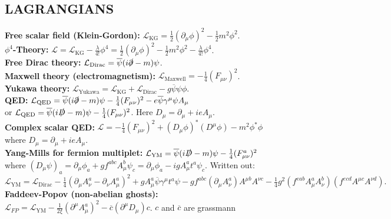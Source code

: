 \documentclass[a4paper, norsk, 8pt, landscape]{article}
\begin{document}
\begin{multicols*}{3}
\subsection*{\footnotesize  LAGRANGIANS}
 {\textbf{Free scalar field (Klein-Gordon):}}
$\mathcal{L}_{\text{KG}}=\frac{1}{2}(\partial_\mu \phi)^2-\frac{1}{2}m^2 \phi^2$.
\\
 {\textbf{$\phi^4$-Theory:}}
$\mathcal{L}=\mathcal{L}_{\text{KG}}-\frac{\lambda}{4!}\phi^4 =\frac{1}{2}(\partial_\mu \phi)^2-\frac{1}{2}m^2 \phi^2 -\frac{\lambda}{4!}\phi^4$.
\\
 {\textbf{Free Dirac theory:}}
$\mathcal{L}_{\text{Dirac}}=\overline{\psi}(i\slashed{\partial}-m)\psi$.
\\
 {\textbf{Maxwell theory (electromagnetism):}}
$\mathcal{L}_{\text{Maxwell}}=- \frac{1}{4}(F_{\mu\nu})^2$.
\\
 {\textbf{Yukawa theory:}}
$\mathcal{L}_{\text{Yukawa}}=\mathcal{L}_{\text{KG}}+\mathcal{L}_{\text{Dirac}}-g\overline{\psi}\psi \phi$.
\\
 {\textbf{QED:}}
$\mathcal{L}_{\text{QED}}=\overline{\psi}(i\slashed{\partial}-m)\psi
- \frac{1}{4}(F_{\mu\nu})^2-e\overline{\psi}\gamma^\mu \psi A_\mu$ \\
or
$\mathcal{L}_{\text{QED}}=\overline{\psi}(i\slashed{D}-m)\psi
- \frac{1}{4}(F_{\mu\nu})^2$. Here $D_\mu=\partial_\mu+ieA_\mu$.
\\
 {\textbf{Complex scalar QED:}}
$\mathcal{L}= -\frac{1}{4}(F_{\mu\nu})^2 +(D_\mu \phi)^* (D^\mu \phi) -m^2 \phi^* \phi$ \\
where $D_\mu = \partial_\mu + ie A_\mu$.
\\
 {\textbf{Yang-Mills for fermion multiplet:}}
$\mathcal{L}_{\text{YM}}= \overline{\psi}(i\slashed{D}-m)\psi-\frac{1}{4}(F_{\mu\nu}^a)^2$ \\
where $(D_\mu \psi)_a = \partial_\mu \phi_a + gf^{abc}A_\mu^b \psi_c
= \partial_\mu \phi_a - igA_\mu^a t^a \psi_c$. Written out: \\
$\mathcal{L}_{\text{YM}}=
\mathcal{L}_{\text{Dirac}}
-\frac{1}{4}(\partial_\mu A_\nu^a - \partial_\nu A_\mu^a)^2
+gA_\mu^a\overline{\psi}\gamma^\mu t^a \psi
-gf^{abc}(\partial_\mu A_\nu^a)A^{\mu b}A^{\nu c}
-\frac{1}{4}g^2(f^{eab}A_\mu^a A_\nu^b)(f^{ecd}A^{\mu c}A^{\nu d}).$
\\
 {\textbf{Faddeev-Popov (non-abelian ghosts):}} \\
$\mathcal{L}_{FP} = \mathcal{L}_{\text{YM}}
- \frac{1}{2\xi}\left(\partial^\mu A_\mu^a\right)^2
- \overline{c}(\partial^\mu D_\mu)c$. $c$ and $\overline{c}$ are grassmann

\end{multicols*}
\end{document}
